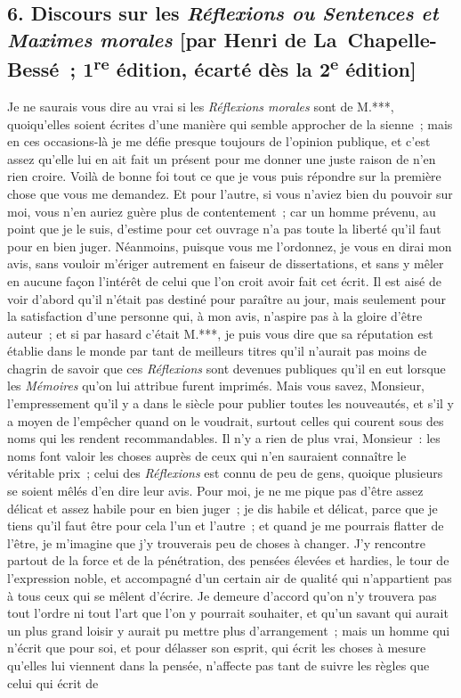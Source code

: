 \documentclass[french,twoside]{book} %
\newcommand{\salute}[1]{\bigbreak{#1}\par\medbreak}
\begin{document}
\subsection[{6. Discours sur les Réflexions ou Sentences et Maximes morales [par Henri de La Chapelle-Bessé ; 1re édition, écarté dès la 2e édition]}]{6. Discours sur les {\itshape Réflexions ou Sentences et Maximes morales} [par Henri de La Chapelle-Bessé ; 1\textsuperscript{re} édition, écarté dès la 2\textsuperscript{e} édition]}

\salute{Monsieur,}
\noindent Je ne saurais vous dire au vrai si les {\itshape Réflexions morales} sont de M.***, quoiqu’elles soient écrites d’une manière qui semble approcher de la sienne ; mais en ces occasions-là je me défie presque toujours de l’opinion publique, et c’est assez qu’elle lui en ait fait un présent pour me donner une juste raison de n’en rien croire. Voilà de bonne foi tout ce que je vous puis répondre sur la première chose que vous me demandez. Et pour l’autre, si vous n’aviez bien du pouvoir sur moi, vous n’en auriez guère plus de contentement ; car un homme prévenu, au point que je le suis, d’estime pour cet ouvrage n’a pas toute la liberté qu’il faut pour en bien juger. Néanmoins, puisque vous me l’ordonnez, je vous en dirai mon avis, sans vouloir m’ériger autrement en faiseur de dissertations, et sans y mêler en aucune façon l’intérêt de celui que l’on croit avoir fait cet écrit. Il est aisé de voir d’abord qu’il n’était pas destiné pour paraître au jour, mais seulement pour la satisfaction d’une personne qui, à mon avis, n’aspire pas à la gloire d’être auteur ; et si par hasard c’était M.***, je puis vous dire que sa réputation est établie dans le monde par tant de meilleurs titres qu’il n’aurait pas moins de chagrin de savoir que ces {\itshape Réflexions} sont devenues publiques qu’il en eut lorsque les {\itshape Mémoires} qu’on lui attribue furent imprimés. Mais vous savez, Monsieur, l’empressement qu’il y a dans le siècle pour publier toutes les nouveautés, et s’il y a moyen de l’empêcher quand on le voudrait, surtout celles qui courent sous des noms qui les rendent recommandables. Il n’y a rien de plus vrai, Monsieur : les noms font valoir les choses auprès de ceux qui n’en sauraient connaître le véritable prix ; celui des {\itshape Réflexions} est connu de peu de gens, quoique plusieurs se soient mêlés d’en dire leur avis. Pour moi, je ne me pique pas d’être assez délicat et assez habile pour en bien juger ; je dis habile et délicat, parce que je tiens qu’il faut être pour cela l’un et l’autre ; et quand je me pourrais flatter de l’être, je m’imagine que j’y trouverais peu de choses à changer. J’y rencontre partout de la force et de la pénétration, des pensées élevées et hardies, le tour de l’expression noble, et accompagné d’un certain air de qualité qui n’appartient pas à tous ceux qui se mêlent d’écrire. Je demeure d’accord qu’on n’y trouvera pas tout l’ordre ni tout l’art que l’on y pourrait souhaiter, et qu’un savant qui aurait un plus grand loisir y aurait pu mettre plus d’arrangement ; mais un homme qui n’écrit que pour soi, et pour délasser son esprit, qui écrit les choses à mesure qu’elles lui viennent dans la pensée, n’affecte pas tant de suivre les règles que celui qui écrit de 
\end{document}
